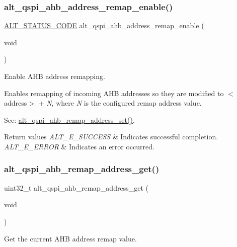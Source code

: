 \subsubsection{\texorpdfstring{alt\_qspi\_ahb\_address\_remap\_enable()}{alt\_qspi\_ahb\_address\_remap\_enable()}}
{\footnotesize\ttfamily \mbox{\hyperlink{hwlib_8h_abdb0d369f069723ca55d6c94bcaaaa12}{A\+L\+T\+\_\+\+S\+T\+A\+T\+U\+S\+\_\+\+C\+O\+DE}} alt\+\_\+qspi\+\_\+ahb\+\_\+address\+\_\+remap\+\_\+enable (\begin{DoxyParamCaption}\item[{void}]{ }\end{DoxyParamCaption})}

Enable A\+HB address remapping.

Enables remapping of incoming A\+HB addresses so they are modified to $<$address$>$ + {\itshape N}, where {\itshape N} is the configured remap address value.

See\+: \mbox{\hyperlink{group__ALT__QSPI__DAC_gad7b0dc3a61560e7d7c2edeb9204698ad}{alt\+\_\+qspi\+\_\+ahb\+\_\+remap\+\_\+address\+\_\+set()}}.


\begin{DoxyRetVals}{Return values}
{\em A\+L\+T\+\_\+\+E\+\_\+\+S\+U\+C\+C\+E\+SS} & Indicates successful completion. \\
\hline
{\em A\+L\+T\+\_\+\+E\+\_\+\+E\+R\+R\+OR} & Indicates an error occurred. \\
\hline
\end{DoxyRetVals}
\mbox{\label{group__ALT__QSPI__DAC_ga37e95f1b1aba211cf942a9db0ca46073}} 
\subsubsection{\texorpdfstring{alt\_qspi\_ahb\_remap\_address\_get()}{alt\_qspi\_ahb\_remap\_address\_get()}}
{\footnotesize\ttfamily uint32\+\_\+t alt\+\_\+qspi\+\_\+ahb\+\_\+remap\+\_\+address\+\_\+get (\begin{DoxyParamCaption}\item[{void}]{ }\end{DoxyParamCaption})}

Get the current A\+HB address remap value.

